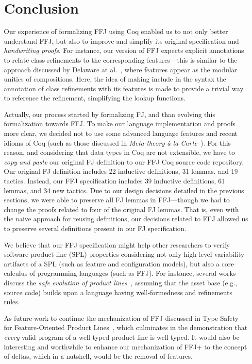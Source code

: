 \chapter{Conclusion}\label{chap:conclusion}

Our experience of formalizing \gls{FFJ} 
using Coq enabled us to 
not only better understand \gls{FFJ}, but also to improve and 
simplify its original specification and \emph{handwriting 
proofs}. For instance, our version of \gls{FFJ} expects 
explicit annotations to relate class refinements to the 
corresponding features---this is similar to the 
approach discussed by Delaware at al.~\cite{delaware:fse-2009}, 
where features appear as the modular unities of compositions. 
Here, the idea of making include in the syntax the annotation 
of class refinements with its features is made to provide a trivial way to 
reference the refinement, simplifying the lookup functions.

Actually, our process started by formalizing \gls{FJ}, 
and than evolving this formalization towards \gls{FFJ}. 
To make our language implementation and proofs more clear, 
we decided not to use some advanced language features 
and recent idioms of Coq (such as those discussed in \emph{Meta-theory \`{a} la Carte}~\cite{delaware:popl2013}). 
For this reason, and considering that data types in Coq are not extensible, 
we have to \emph{copy and paste} our original \gls{FJ} definition 
to our \gls{FFJ} Coq source code repository. Our original \gls{FJ} 
definition includes 22 inductive definitions, 31 lemmas, and 
19 tactics. Instead, our \gls{FFJ} specification includes 
39 inductive definitions, 61 lemmas, and 34 new tactics. Due to our 
design decisions detailed in the previous sections, 
we were able to preserve all \gls{FJ} lemmas in \gls{FFJ}---though 
we had to change the proofs related to four of the original \gls{FJ} 
lemmas. That is, even with the naive approach for reusing 
definitions, our decisions related to \gls{FFJ} 
allowed us to preserve several definitions present 
in our \gls{FJ} specification. 

We believe that our \gls{FFJ} specification might 
help other researchers to verify software product 
line (SPL) properties considering not only high level 
variability artifacts of a SPL (such as feature and configuration 
models), but also a core calculus of programming 
languages (such as \gls{FFJ}). For instance, 
several works discuss the \emph{safe evolution 
of product lines}~\cite{neves2012investigating}, assuming that the asset 
base (e.g., source code) builds upon a 
language having well-formedness and 
refinements rules.  

As future work to continue the mechanization of \gls{FFJ} discussed in 
Type Safety for Feature-Oriented Product Lines~\cite{apel2010type}, which culminates
in the demonstration that \emph{every} valid program of a well-typed product
line is well-typed. It would also be interesting and worthwhile to enhance our
mechanization of \gls{FFJ+} to the concept of deltas, which in a nutshell,
would be the removal of features.
